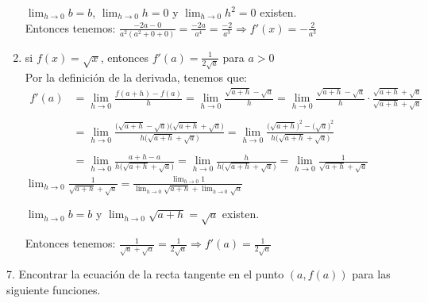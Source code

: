 \documentclass[12pt]{article}
\begin{document}
\begin{enumerate}[\hspace{9px} a)]
        \(\displaystyle\lim_{h \to 0}b=b\), \(\displaystyle\lim_{h \to 0}h=0\) y \(\displaystyle\lim_{h \to 0}h^2=0\) existen.\\

        Entonces tenemos: \quad \(\displaystyle\frac{-2a-0}{a^2(a^2+0+0)}=\frac{-2a}{a^4}=\frac{-2}{a^3} \Longrightarrow f'(x)=-\frac{2}{a^3}\)\\

    \item si \(f(x)=\sqrt{x}\), entonces \(f'(a)=\displaystyle\frac{1}{2\sqrt{a}}\) para \(a > 0\)\\

        Por la definición de la derivada, tenemos que:
        \begin{align*}
            f'(a)&=\displaystyle\lim_{h \to 0}\frac{f(a+h)-f(a)}{h}=\displaystyle\lim_{h \to 0}\frac{\sqrt{a+h}-\sqrt{a}}{h}=\displaystyle\lim_{h \to 0}\frac{\sqrt{a+h}-\sqrt{a}}{h} \cdot \frac{\sqrt{a+h}+\sqrt{a}}{\sqrt{a+h}+\sqrt{a}}\\ \\
            &=\displaystyle\lim_{h \to 0}\frac{\big(\sqrt{a+h}-\sqrt{a}\big)\big(\sqrt{a+h}+\sqrt{a}\big)}{h\big(\sqrt{a+h}+\sqrt{a}\big)}=\displaystyle\lim_{h \to 0}\frac{\big(\sqrt{a+h}\big)^2-(\sqrt{a}\big)^2}{h\big(\sqrt{a+h}+\sqrt{a}\big)}\\ \\
            &=\displaystyle\lim_{h \to 0}\frac{a+h-a}{h\big(\sqrt{a+h}+\sqrt{a}\big)}=\displaystyle\lim_{h \to 0}\frac{h}{h\big(\sqrt{a+h}+\sqrt{a}\big)}=\displaystyle\lim_{h \to 0}\frac{1}{\sqrt{a+h}+\sqrt{a}}
        \end{align*}\medskip
        \(\displaystyle\lim_{h \to 0}\frac{1}{\sqrt{a+h}+\sqrt{a}}=\displaystyle\frac{\displaystyle\lim_{h \to 0}1}{\displaystyle\lim_{h \to 0}\sqrt{a+h}+\displaystyle\lim_{h \to 0}\sqrt{a}}\)\medskip

        \(\displaystyle\lim_{h \to 0}b=b\) y \(\displaystyle\lim_{h \to 0}\sqrt{a+h}=\sqrt{a}\)  existen.\medskip

        Entonces tenemos: \quad \(\displaystyle\frac{1}{\sqrt{a}+\sqrt{a}}=\frac{1}{2\sqrt{a}} \Longrightarrow f'(a)=\frac{1}{2\sqrt{a}}\)

\end{enumerate}

7. Encontrar la ecuación de la recta tangente en el punto \((a,f(a))\) para las siguiente funciones.
\end{document}
